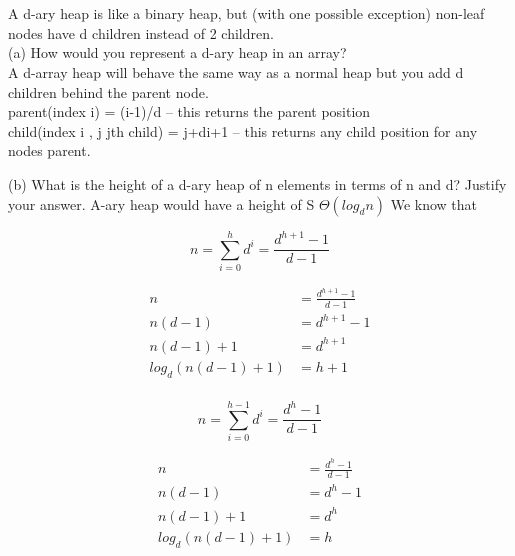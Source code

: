 \documentclass[12pt]{article}
\begin{document}
 	
 
 	\section{}
  
  A d-ary heap is like a binary heap, but (with one possible exception) non-leaf nodes have
d children instead of 2 children.\\
	\pagebreak
(a) How would you represent a d-ary heap in an array?\\

A d-array heap will behave the same way as a normal heap but you add d children behind the parent node.\\

parent(index i) = {(i-1)/d} -- this returns the parent position\\
child(index i , j jth child) = j+di+1 -- this returns any child position for any nodes parent.


(b) What is the height of a d-ary heap of n elements in terms of n and d? Justify your answer.
A-ary heap would have a height of S $\Theta(log_dn)$ We know that
		
		\begin{equation}
 	 		n = \sum_{i=0}^{h}d^i	 = \frac{d^{h+1}-1}{d-1}
 		\end{equation} 
	
	\begin{align*}
	n &= \frac{d^{h+1}-1}{d-1}\\
	n(d-1) &= d^{h+1}-1\\
	n(d-1)+1 &= d^{h+1}\\
	log_d(n(d-1)+1) &= h+1\\	
	\end{align*}
	
	\begin{equation}
 	 		n = \sum_{i=0}^{h-1}d^i = \frac{d^{h}-1}{d-1}
 		\end{equation} 
 		
	\begin{align*}
	n &= \frac{d^{h}-1}{d-1}\\
	n(d-1) &= d^{h}-1\\
	n(d-1)+1 &= d^{h}\\
	log_d(n(d-1)+1) &= h\\	
	\end{align*}
 	
\end{document}
